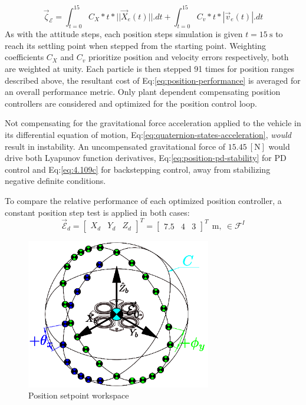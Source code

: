 \begin{equation}\label{eq:position-performance}
\vec{\zeta}_{\mathcal{E}}=\int_{t=0}^{15}C_{X}*t*||\vec{X}_e(t)||.dt+\int_{t=0}^{15}C_{v}*t*|\vec{v}_e(t)|.dt
\end{equation}
As with the attitude steps, each position steps simulation is given $t=15~\text{s}$ to reach its settling point when stepped from the starting point. Weighting coefficients $C_X$ and $C_v$ prioritize position and velocity errors respectively, both are weighted at unity. Each particle is then stepped 91 times for position ranges described above, the resultant cost of Eq:\ref{eq:position-performance} is averaged for an overall performance metric. Only plant dependent compensating position controllers are considered and optimized for the position control loop.
\par
Not compensating for the gravitational force acceleration applied to the vehicle in its differential equation of motion, Eq:\ref{eq:quaternion-states-acceleration}, \emph{would} result in instability. An uncompensated gravitational force of $15.45~[\text{N}]$ would drive both Lyapunov function derivatives, Eq:\ref{eq:position-pd-stability} for PD control and Eq:\ref{eq:4.109c} for backstepping control, away from stabilizing negative definite conditions. 
\par
To compare the relative performance of each optimized position controller, a constant position step test is applied in both cases:
\begin{equation}\label{eq:position-step}
\vec{\mathcal{E}}_d=\begin{bmatrix}
X_d&
Y_d&
Z_d
\end{bmatrix}^T=\begin{bmatrix}
7.5&
4&
3
\end{bmatrix}^T~~\text{m},~\in\mathcal{F}^{I}
\end{equation}
\par
\begin{figure}[htbp]
\vspace{-16pt}
\centering
\includegraphics[width=0.72\textwidth]{figs/position-setpoint}
\vspace{-6pt}
\caption{Position setpoint workspace}
\label{fig:position-setpoint}
\vspace{-16pt}
\end{figure}
